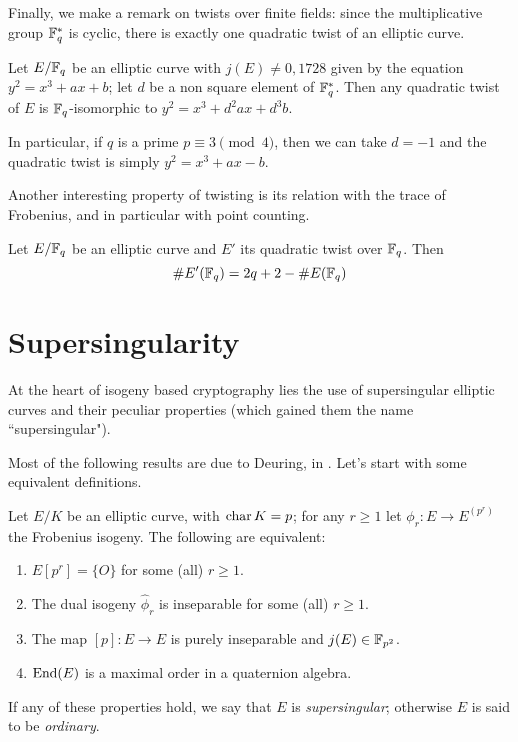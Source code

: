 Finally, we make a remark on twists over finite fields: since the multiplicative group $\mathbb{F}_q^\ast$ is cyclic, there is exactly one quadratic twist of an elliptic curve.
\begin{proposition}
    Let $E/\mathbb{F}_q$ be an elliptic curve with $j(E)\neq0,1728$ given by the equation $y^2=x^3+ax+b$; let $d$ be a non square element of $\mathbb{F}_q^\ast$. Then any quadratic twist of $E$ is $\mathbb{F}_q$-isomorphic to $y^2=x^3+d^2ax+d^3b$.
\end{proposition}
In particular, if $q$ is a prime $p\equiv3\pmod4$, then we can take $d=-1$ and the quadratic twist is simply $y^2=x^3+ax-b$.

Another interesting property of twisting is its relation with the trace of Frobenius, and in particular with point counting.
\begin{proposition}
    Let $E/\mathbb{F}_q$ be an elliptic curve and $E'$ its quadratic twist over $\mathbb{F}_q$. Then $$\# E'(\mathbb{F}_q) = 2q+2 - \# E(\mathbb{F}_q)$$
\end{proposition}

\section{Supersingularity}

At the heart of isogeny based cryptography lies the use of supersingular elliptic curves and their peculiar properties (which gained them the name ``supersingular").

Most of the following results are due to Deuring, in \cite{Deuring1941}. Let's start with some equivalent definitions.
\begin{theorem}
    Let $E/K$ be an elliptic curve, with $\operatorname{char} K=p$; for any $r\ge1$ let $\phi_r:E\to E^{(p^r)}$ the Frobenius isogeny. The following are equivalent:
    \begin{enumerate}
        \item $E[p^r]=\{O\}$ for some (all) $r\ge1$.
        \item The dual isogeny $\hat\phi_r$ is inseparable for some (all) $r\ge1$.
        \item The map $[p]:E\to E$ is purely inseparable and $j(E)\in\mathbb{F}_{p^2}$.
        \item $\operatorname{End}(E)$ is a maximal order in a quaternion algebra.
    \end{enumerate}
    If any of these properties hold, we say that $E$ is \emph{supersingular}; otherwise $E$ is said to be \emph{ordinary}.
\end{theorem}

